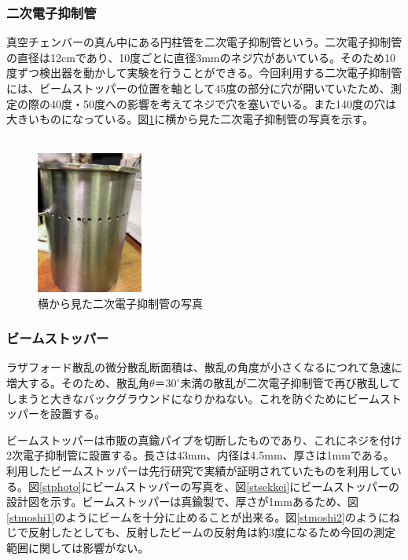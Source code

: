 \documentclass[a4paper,11pt,dvipdfmx]{jsarticle}
\begin{document}
\subsubsection{二次電子抑制管}
真空チェンバーの真ん中にある円柱管を二次電子抑制管という。二次電子抑制管の直径は12cmであり、10度ごとに直径3mmのネジ穴があいている。そのため10度ずつ検出器を動かして実験を行うことができる。今回利用する二次電子抑制管には、ビームストッパーの位置を軸として45度の部分に穴が開いていたため、測定の際の40度・50度への影響を考えてネジで穴を塞いでいる。また140度の穴は大きいものになっている。図\ref{yokokan}に横から見た二次電子抑制管の写真を示す。
　
　 \begin{figure}[H]
    \centering
    \includegraphics[width=35mm]{picture/setup/yokokan.jpg}
    \caption{横から見た二次電子抑制管の写真}
    \label{yokokan}
  \end{figure}
  
\subsubsection{ビームストッパー}
ラザフォード散乱の微分散乱断面積は、散乱の角度が小さくなるにつれて急速に増大する。そのため、散乱角$\theta＝30^{\circ}$未満の散乱が二次電子抑制管で再び散乱してしまうと大きなバックグラウンドになりかねない。これを防ぐためにビームストッパーを設置する。

\par
ビームストッパーは市販の真鍮パイプを切断したものであり、これにネジを付け2次電子抑制管に設置する。長さは43mm、内径は4.5mm、厚さは1mmである。利用したビームストッパーは先行研究\cite{2019}で実績が証明されていたものを利用している。図\ref{stphoto}にビームストッパーの写真を、図\ref{stsekkei}にビームストッパーの設計図を示す。ビームストッパーは真鍮製で、厚さが1mmあるため、図\ref{stmoshi1}のようにビームを十分に止めることが出来る。図\ref{stmoshi2}のようにねじで反射したとしても、反射したビームの反射角は約3度になるため今回の測定範囲に関しては影響がない。
\end{document}

